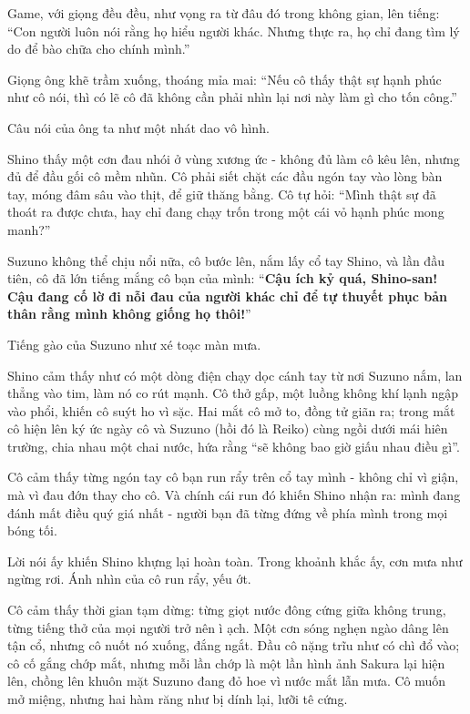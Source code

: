 \documentclass[../main.tex]{subfiles}
\begin{document}
Game, với giọng đều đều, như vọng ra từ đâu đó trong không gian, lên tiếng: ``Con người luôn nói rằng họ hiểu người khác. Nhưng thực ra, họ chỉ đang tìm lý do để bào chữa cho chính mình.''

Giọng ông khẽ trầm xuống, thoáng mỉa mai: ``Nếu cô thấy thật sự hạnh phúc như cô nói, thì có lẽ cô đã không cần phải nhìn lại nơi này làm gì cho tốn công.''

Câu nói của ông ta như một nhát dao vô hình.

Shino thấy một cơn đau nhói ở vùng xương ức - không đủ làm cô kêu lên, nhưng đủ để đầu gối cô mềm nhũn. Cô phải siết chặt các đầu ngón tay vào lòng bàn tay, móng đâm sâu vào thịt, để giữ thăng bằng. Cô tự hỏi: ``Mình thật sự đã thoát ra được chưa, hay chỉ đang chạy trốn trong một cái vỏ hạnh phúc mong manh?''

Suzuno không thể chịu nổi nữa, cô bước lên, nắm lấy cổ tay Shino, và lần đầu tiên, cô đã lớn tiếng mắng cô bạn của mình: ``\textbf{Cậu ích kỷ quá, Shino-san! Cậu đang cố lờ đi nỗi đau của người khác chỉ để tự thuyết phục bản thân rằng mình không giống họ thôi!}''

Tiếng gào của Suzuno như xé toạc màn mưa.

Shino cảm thấy như có một dòng điện chạy dọc cánh tay từ nơi Suzuno nắm, lan thẳng vào tim, làm nó co rút mạnh. Cô thở gấp, một luồng không khí lạnh ngập vào phổi, khiến cô suýt ho vì sặc. Hai mắt cô mở to, đồng tử giãn ra; trong mắt cô hiện lên ký ức ngày cô và Suzuno (hồi đó là Reiko) cùng ngồi dưới mái hiên trường, chia nhau một chai nước, hứa rằng ``sẽ không bao giờ giấu nhau điều gì''.

Cô cảm thấy từng ngón tay cô bạn run rẩy trên cổ tay mình - không chỉ vì giận, mà vì đau đớn thay cho cô. Và chính cái run đó khiến Shino nhận ra: mình đang đánh mất điều quý giá nhất - người bạn đã từng đứng về phía mình trong mọi bóng tối.

Lời nói ấy khiến Shino khựng lại hoàn toàn. Trong khoảnh khắc ấy, cơn mưa như ngừng rơi. Ánh nhìn của cô run rẩy, yếu ớt.

Cô cảm thấy thời gian tạm dừng: từng giọt nước đông cứng giữa không trung, từng tiếng thở của mọi người trở nên ì ạch. Một cơn sóng nghẹn ngào dâng lên tận cổ, nhưng cô nuốt nó xuống, đắng ngắt. Đầu cô nặng trĩu như có chì đổ vào; cô cố gắng chớp mắt, nhưng mỗi lần chớp là một lần hình ảnh Sakura lại hiện lên, chồng lên khuôn mặt Suzuno đang đỏ hoe vì nước mắt lẫn mưa. Cô muốn mở miệng, nhưng hai hàm răng như bị dính lại, lưỡi tê cứng.
\end{document}
